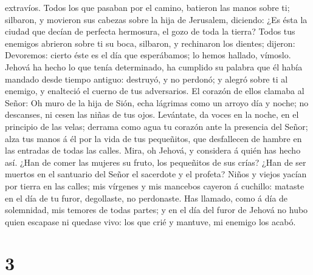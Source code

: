 extravíos.  Todos los que pasaban por el camino, batieron
las manos sobre ti; silbaron, y movieron sus cabezas sobre la hija de
Jerusalem, diciendo: ¿Es ésta la ciudad que decían de perfecta
hermosura, el gozo de toda la tierra?  Todos tus enemigos
abrieron sobre ti su boca, silbaron, y rechinaron los dientes; dijeron:
Devoremos: cierto éste es el día que esperábamos; lo hemos hallado,
vímoslo.  Jehová ha hecho lo que tenía determinado, ha
cumplido su palabra que él había mandado desde tiempo antiguo: destruyó,
y no perdonó; y alegró sobre ti al enemigo, y enalteció el cuerno de tus
adversarios.  El corazón de ellos clamaba al Señor: Oh
muro de la hija de Sión, echa lágrimas como un arroyo día y noche; no
descanses, ni cesen las niñas de tus ojos.  Levántate, da
voces en la noche, en el principio de las velas; derrama como agua tu
corazón ante la presencia del Señor; alza tus manos á él por la vida de
tus pequeñitos, que desfallecen de hambre en las entradas de todas las
calles.  Mira, oh Jehová, y considera á quién has hecho
así. ¿Han de comer las mujeres su fruto, los pequeñitos de sus crías?
¿Han de ser muertos en el santuario del Señor el sacerdote y el profeta?
 Niños y viejos yacían por tierra en las calles; mis
vírgenes y mis mancebos cayeron á cuchillo: mataste en el día de tu
furor, degollaste, no perdonaste.  Has llamado, como á
día de solemnidad, mis temores de todas partes; y en el día del furor de
Jehová no hubo quien escapase ni quedase vivo: los que crié y mantuve,
mi enemigo los acabó.

\hypertarget{section-2}{%
\section{3}\label{section-2}}

